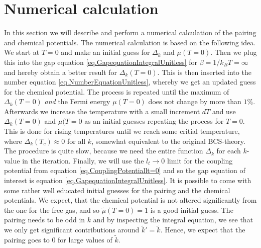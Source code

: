 \section{Numerical calculation} \label{sec.pairingandchemicalpotential.numericalcalculation}
In this section we will describe and perform a numerical calculation of the pairing and chemical potentials. The numerical calculation is based on the following idea. We start at $T=0$ and make an initial guess for $\Delta_k$ and $\mu(T=0)$. Then we plug this into the gap equation \eqref{eq.GapequationIntegralUnitless} for $\beta = 1/k_BT = \infty$ and hereby obtain a better result for $\Delta_k(T=0)$. This is then inserted into the number equation \eqref{eq.NumberEquationUnitless}, whereby we get an updated guess for the chemical potential. The process is repeated until the maximum of $\Delta_k(T=0)$ \textit{and} the Fermi energy $\mu(T=0)$ does not change by more than $1\%$. Afterwards we increase the temperature with a small increment $dT$ and use $\Delta_k(T=0)$ and $\mu(T=0$ as an initial guesses repeating the process for $T=0$. This is done for rising temperatures until we reach some critial temperature, where $\Delta_k(T_c)\approx 0$ for all $k$, somewhat equivalent to the original BCS-theory\cite{Tinkham,LandauStatPhys2,PlischkeStatPhys}. The procedure is quite slow, because we need the entire function $\Delta_k$ for each $k$-value in the iteration. Finally, we will use the $l_t \to 0$ limit for the coupling potential from equation \eqref{eq.CouplingPotentiallt=0} and so the gap equation of interest is equation \eqref{eq.GapequationIntegralUnitless}. It is possible to come with some rather well educated initial guesses for the pairing and the chemical potentials. We expect, that the chemical potential is not altered significantly from the one for the free gas, and so $\tilde{\mu}(T = 0) = 1$ is a good initial guess. The pairing needs to be odd in $k$ and by inspecting the integral equation, we see that we only get significant contributions around $\tilde{k}' = \tilde{k}$. Hence, we expect that the pairing goes to 0 for large values of $\tilde{k}$.  

